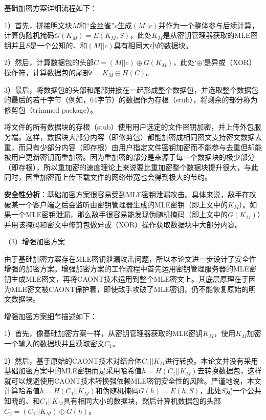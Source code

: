 \documentclass[promaster]{thesis-uestc}
\begin{document}
基础加密方案详细流程如下：

1）首先，拼接明文块$M$和“金丝雀”$c$生成$(M||c)$并作为一个整体参与后续计算，计算伪随机掩码$G(K_M) = E(K_M, S)$，此处$K_M$是从密钥管理器获取的MLE密钥并且$S$是一个公知的、和$(M||c)$具有相同大小的数据块。

2）然后，计算数据包的头部$C = (M||c) \oplus G(K_M)$，此处‘$\oplus$’是异或（XOR）操作符，计算数据包的尾部$t = K_M \oplus H(C)$。

3）最后，将数据包的头部和尾部拼接在一起形成整个数据包，并选取整个数据包的最后的若干字节（例如，64字节）的数据作为存根（stub），将剩余的部分称为修剪包（trimmed package）。

将文件的所有数据块的存根（stub）使用用户选定的文件密钥加密，并上传外包服务端。这样，数据块大部分内容（即修剪包）都能加密成相同密文支持密文数据去重，而只有少部分内容（即存根）由用户指定文件密钥加密而不能参与去重但却能被用户更新密钥而重加密。因为重加密的部分是来源于每一个数据块的极少部分（即存根），所以重加密的速度理论上来说要比重加密整个数据块提升很大，与此同时，因重加密而上传下载文件的网络带宽也会得到极大的节约。

\textbf{安全性分析}：基础加密方案很容易受到MLE密钥泄漏攻击。具体来说，敌手在攻破某一个客户端之后会监听由密钥管理器生成的MLE密钥（即上文中的$K_M$）。如果一个MLE密钥泄漏，那么敌手很容易能发现伪随机掩码（即上文中的$G(K_M)$）并用该掩码和密文中修剪包做异或（XOR）操作获取数据块中大部分内容。

（3）增强加密方案\label{caont-enhanced}

由于基础加密方案存在MLE密钥泄漏攻击问题，所以本论文进一步设计了安全性增强的加密方案。增强加密方案的工作流程中首先运用密钥管理服务器的MLE密钥生成MLE密文，再将CAONT技术运用到整个MLE密文上。其底层原理在于因为MLE密文被CAONT保护着，即使敌手攻破了MLE密钥，仍不能恢复原始的明文数据块。

增强加密方案细节描述如下：

1）首先，像基础加密方案一样，从密钥管理器获取的MLE密钥$K_M$，使用$K_M$加密一个输入的数据块并且获取密文$C_1$。

2）然后，基于原始的CAONT技术对结合体$C_1||K_M$进行转换。本论文并没有采用基础加密方案中的MLE密钥而是采用哈希值$h =  H(C_1||K_M)$去转换数据包，这样就可以规避使用CAONT技术转换强依赖MLE密钥安全性的风险。严谨地说，本文计算哈希值$h = H(C_1||K_M)$和伪随机掩码$G(h) = E(h, S)$，此处$S$是一个公共知晓的、和$C_1||K_M$具有相同大小的数据块，然后计算机数据包的头部$C_2 = (C_1||K_M) \oplus G(h)$。
\end{document}
